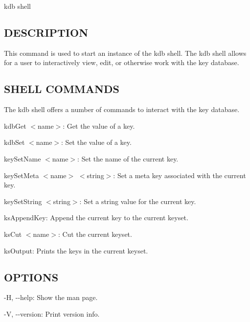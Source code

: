 {\ttfamily kdb shell}

\subsection*{D\+E\+S\+C\+R\+I\+P\+T\+I\+O\+N}

This command is used to start an instance of the kdb shell. The kdb shell allows for a user to interactively view, edit, or otherwise work with the key database.

\subsection*{S\+H\+E\+L\+L C\+O\+M\+M\+A\+N\+D\+S}

The kdb shell offers a number of commands to interact with the key database.


\begin{DoxyItemize}
\item {\ttfamily kdb\+Get $<$name$>$}\+: Get the value of a key.
\item {\ttfamily kdb\+Set $<$name$>$}\+: Set the value of a key.
\item {\ttfamily key\+Set\+Name $<$name$>$}\+: Set the name of the current key.
\item {\ttfamily key\+Set\+Meta $<$name$>$ $<$string$>$}\+: Set a meta key associated with the current key.
\item {\ttfamily key\+Set\+String $<$string$>$}\+: Set a string value for the current key.
\item {\ttfamily ks\+Append\+Key}\+: Append the current key to the current keyset.
\item {\ttfamily ks\+Cut $<$name$>$}\+: Cut the current keyset.
\item {\ttfamily ks\+Output}\+: Prints the keys in the current keyset.
\end{DoxyItemize}

\subsection*{O\+P\+T\+I\+O\+N\+S}


\begin{DoxyItemize}
\item {\ttfamily -\/\+H}, {\ttfamily -\/-\/help}\+: Show the man page.
\item {\ttfamily -\/\+V}, {\ttfamily -\/-\/version}\+: Print version info.
\end{DoxyItemize}

